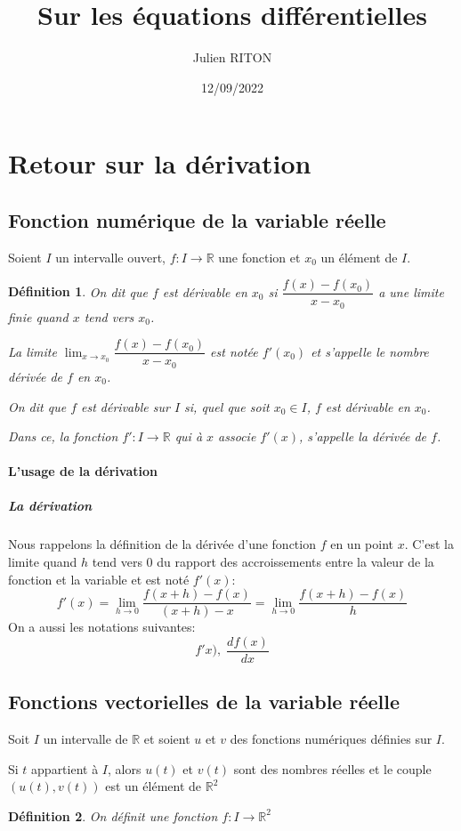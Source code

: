 \documentclass[10pt,a4paper]{article}
\author{Julien RITON}
\title{Sur les équations différentielles}
\date{12/09/2022}
\newtheorem{dfn}{Définition}
\begin{document}
\maketitle
\section{Retour sur la dérivation}
\subsection{Fonction numérique de la variable réelle}
Soient $I$ un intervalle ouvert, $f:I\rightarrow \mathbb{R}$ une fonction et $x_0$ un élément de $I$.
\begin{dfn}
On dit que $f$ est dérivable en $x_0$ si $\dfrac{f(x)-f(x_0)}{x-x_0}$ a une limite finie quand $x$ tend vers $x_0$.

La limite $\lim_{x\rightarrow x_0} \dfrac{f(x)-f(x_0)}{x-x_0}$ est notée $f'(x_0)$ et s'appelle le nombre dérivée de $f$ en $x_0$.

On dit que $f$ est dérivable sur $I$ si, quel que soit $x_0\in I$, $f$ est dérivable en $x_0$.

Dans ce, la fonction $f':I\rightarrow \mathbb{R}$ qui à $x$ associe $f'(x)$, s'appelle la dérivée de $f$.
\end{dfn}


\paragraph{L'usage de la dérivation}
\subparagraph{La dérivation}
Nous rappelons la définition de la dérivée d'une fonction $f$ en un point $x$.
C'est la limite quand $h$ tend vers $0$ du rapport des accroissements entre la valeur de la fonction et la variable et est noté $f'(x)$:
$$
f'(x)=\lim_{h\rightarrow 0} \dfrac{f(x+h)-f(x)}{(x+h)-x}
=\lim_{h\rightarrow 0} \dfrac{f(x+h)-f(x)}{h}
$$
On a aussi les notations suivantes:
$$f'x), \; \dfrac{df(x)}{dx} $$


\subsection{Fonctions vectorielles de la variable réelle}
Soit $I$ un intervalle de $\mathbb{R}$ et soient $u$ et $v$ des fonctions numériques définies sur $I$.

Si $t$ appartient à $I$, alors $u(t)$ et $v(t)$ sont des nombres réelles et le couple $(u(t),v(t))$ est un élément de $\mathbb{R}^2$
\begin{dfn}
On définit une fonction $f:I\rightarrow \mathbb{R}^2$
\end{dfn}
\end{document}
